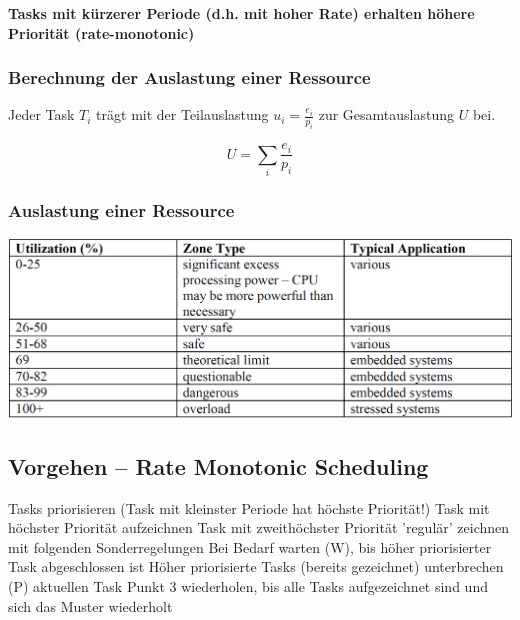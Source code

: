 \vspace{0.1cm}

\textbf{Tasks mit kürzerer Periode (d.h. mit hoher Rate) erhalten höhere Priorität (rate-monotonic)}


\subsubsection{Berechnung der Auslastung einer Ressource}

\begin{minipage}[t]{0.48\columnwidth}
    Jeder Task $T_i$ trägt mit der Teilauslastung $u_i = \frac{e_i}{p_i}$ zur Gesamtauslastung $U$ bei.
\end{minipage}
\hfill
\begin{minipage}[t]{0.48\columnwidth}
    \vspace{-0.2cm}
    $$ U = \sum\limits_{i} \frac{e_i}{p_i} $$
\end{minipage}

\subsubsection{Auslastung einer Ressource}

\includegraphics[width=\columnwidth]{images/tabelle_auslastung_system.png}


\subsection{Vorgehen -- Rate Monotonic Scheduling}

\begingroup
\renewcommand{\outlinei}{enumerate}
\renewcommand{\outlineii}{itemize}
\begin{outline}
    \1 Tasks priorisieren (Task mit kleinster Periode hat höchste Priorität!)
    \1 Task mit höchster Priorität aufzeichnen
    \1 Task mit zweithöchster Priorität 'regulär' zeichnen mit folgenden Sonderregelungen
        \2 Bei Bedarf warten (W), bis höher priorisierter Task abgeschlossen ist 
        \2 Höher priorisierte Tasks (bereits gezeichnet) unterbrechen (P) aktuellen Task
    \1 Punkt 3 wiederholen, bis alle Tasks aufgezeichnet sind und sich das Muster wiederholt
\end{outline}
\endgroup


